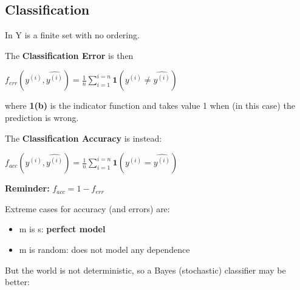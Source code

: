 
\subsection{Classification}

In  Y is a finite set with no ordering.

The \textbf{Classification Error} is then 
\begin{center}
    $f_{err}({y^{(i)}, \hat{y^{(i)}}}) = \frac{1}{n}\sum_{i=1}^{i=n}\textbf{1}(y^{(i)} \neq \hat{y^{(i)}})$
\end{center}

where \textbf{1(b)} is the indicator function and takes value 1 when (in this case) the prediction is wrong.

The \textbf{Classification Accuracy} is instead:
\begin{center}
    $f_{acc}({y^{(i)}, \hat{y^{(i)}}}) = \frac{1}{n}\sum_{i=1}^{i=n}\textbf{1}(y^{(i)} = \hat{y^{(i)}})$
\end{center}

\textbf{Reminder:} $f_{acc} = 1 - f_{err}$

Extreme cases for accuracy (and errors) are:
\begin{itemize}
    \item m is s: \textbf{perfect model}
    \item m is random: does not model any dependence
\end{itemize}

But the world is not deterministic, so a Bayes (stochastic) classifier may be better:

